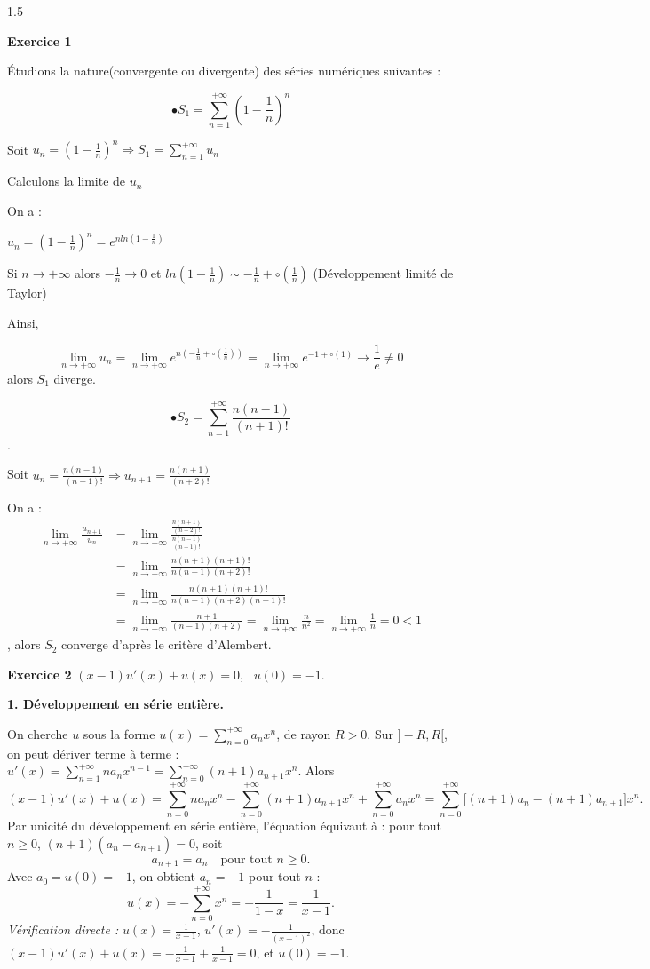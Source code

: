 \documentclass[12pt]{article}
\begin{document}
\begin{spacing}{1.5}

\textbf{Exercice 1}

Étudions la nature(convergente ou divergente) des séries numériques suivantes : 

\[\bullet S_1=\sum^{+\infty}_{n=1}(1-\frac{1}{n})^n\]

Soit $u_n=(1-\frac{1}{n})^n\Longrightarrow S_1=\sum^{+\infty}_{n=1}u_n$

Calculons la limite de $u_n$

On a :

$u_n=(1-\frac{1}{n})^n=e^{nln(1-\frac{1}{n})}$

Si $n\longrightarrow +\infty$ alors $-\frac{1}{n}\longrightarrow 0$ et $ln(1-\frac{1}{n})\sim -\frac{1}{n}+\circ(\frac{1}{n})$ (Développement limité de Taylor)


Ainsi,

 \[\lim_{n\to +\infty} u_n=\lim_{n\to +\infty}e^{n(-\frac{1}{n}+\circ(\frac{1}{n}))}=\lim_{n\to +\infty}e^{-1+\circ(1)}\longrightarrow \frac{1}{e}\neq 0\] alors $S_1$ diverge.

\medskip
\[\bullet S_2=\sum^{+\infty}_{n=1}\frac{n(n-1)}{(n+1)!}\].

Soit $u_n=\frac{n(n-1)}{(n+1)!}\Rightarrow u_{n+1}=\frac{n(n+1)}{(n+2)!}$

On a : 
\begin{align*}
\lim_{n\to +\infty}\frac{u_{n+1}}{u_n} &=\lim_{n\to +\infty}\frac{\frac{n(n+1)}{(n+2)!}}{\frac{n(n-1)}{(n+1)!}}\\
&=\lim_{n\to +\infty}\frac{n(n+1)(n+1)!}{n(n-1)(n+2)!}\\
&=\lim_{n\to +\infty}\frac{n(n+1)(n+1)!}{n(n-1)(n+2)(n+1)!}\\
&=\lim_{n\to +\infty}\frac{n+1}{(n-1)(n+2)}=\lim_{n\to +\infty}\frac{n}{n^2}=\lim_{n\to +\infty}\frac{1}{n}=0<1
\end{align*}, alors $S_2$ converge d'après le critère d'Alembert.



\medskip
\textbf{Exercice 2} \quad $(x-1)u'(x)+u(x)=0$, \ $u(0)=-1$.

\textbf{1. Développement en série entière.}

On cherche $u$ sous la forme $u(x)=\displaystyle\sum_{n=0}^{+\infty}a_nx^n$, de rayon $R>0$. Sur $]-R,R[$, on peut dériver terme à terme : $u'(x)=\displaystyle\sum_{n=1}^{+\infty}na_nx^{n-1}=\sum_{n=0}^{+\infty}(n+1)a_{n+1}x^n$. Alors
\[
(x-1)u'(x)+u(x)=\sum_{n=0}^{+\infty}na_nx^n-\sum_{n=0}^{+\infty}(n+1)a_{n+1}x^n+\sum_{n=0}^{+\infty}a_nx^n=\sum_{n=0}^{+\infty}\big[(n+1)a_n-(n+1)a_{n+1}\big]x^n .
\]
Par unicité du développement en série entière, l'équation équivaut à : pour tout $n\ge0$, $(n+1)(a_n-a_{n+1})=0$, soit
\[
a_{n+1}=a_n\quad\text{pour tout }n\ge0 .
\]
Avec $a_0=u(0)=-1$, on obtient $a_n=-1$ pour tout $n$ :
\[
\boxed{u(x)=-\sum_{n=0}^{+\infty}x^n=-\frac{1}{1-x}=\frac{1}{x-1}}.
\]
\emph{Vérification directe :} $u(x)=\frac1{x-1}$, $u'(x)=-\frac{1}{(x-1)^2}$, donc $(x-1)u'(x)+u(x)=-\frac1{x-1}+\frac1{x-1}=0$, et $u(0)=-1$.


\end{spacing}
\end{document}
